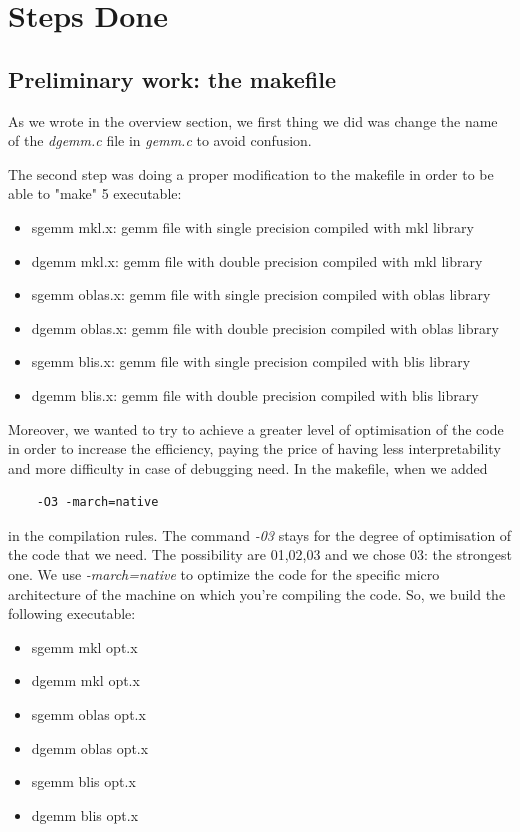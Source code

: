 \documentclass{article}
\begin{document}
\section{Steps Done}
\subsection{Preliminary work: the makefile}
As we wrote in the overview section, we first thing we did was change the name of the \textit{dgemm.c} file in \textit{gemm.c} to avoid confusion.

The second step was doing a proper modification to the makefile in order to be able to "make" 5 executable:
\begin{itemize}
    \item sgemm mkl.x: gemm file with single precision compiled with mkl library 
    \item dgemm mkl.x: gemm file with double precision compiled with mkl library
    \item sgemm oblas.x: gemm file with single precision compiled with oblas library
    \item dgemm oblas.x: gemm file with double precision compiled with oblas library
    \item sgemm blis.x: gemm file with single precision compiled with blis library
    \item dgemm blis.x: gemm file with double precision compiled with blis library
\end{itemize}

Moreover, we wanted to try to achieve a greater level of optimisation of the code in order to increase the efficiency, paying the price of having less interpretability and more difficulty in case of debugging need.  
In the makefile, when we added
\begin{verbatim}
    -O3 -march=native
\end{verbatim}
in the compilation rules. The command \textit{-03} stays for the degree of optimisation of the code that we need. The possibility are 01,02,03 and we chose 03: the strongest one. We use \textit{-march=native} to optimize the code for the specific micro architecture of the machine on which you're compiling the code.
So, we build the following executable:
\begin{itemize}
    \item sgemm mkl opt.x
    \item dgemm mkl opt.x 
    \item sgemm oblas opt.x 
    \item dgemm oblas opt.x 
    \item sgemm blis opt.x 
    \item dgemm blis opt.x 
\end{itemize}
\end{document}
